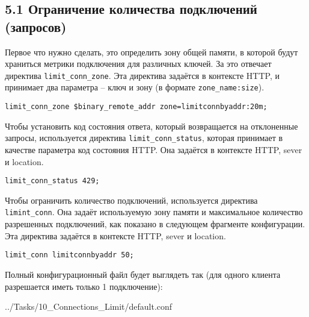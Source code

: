 \subsection*{5.1 Ограничение количества подключений (запросов)}

Первое что нужно сделать, это определить зону общей памяти, в которой будут храниться метрики подключения для различных ключей. За это отвечает директива \texttt{limit\_conn\_zone}. Эта директива задаётся в контексте HTTP, и принимает два параметра -- ключ и зону (в формате \texttt{zone\_name:size}).

\texttt{limit\_conn\_zone \$binary\_remote\_addr zone=limitconnbyaddr:20m;}

Чтобы установить код состояния ответа, который возвращается на отклоненные запросы, используется директива \texttt{limit\_conn\_status}, которая принимает в качестве параметра код состояния HTTP. Она задаётся в контексте HTTP, sever и location.

\texttt{limit\_conn\_status 429;}

Чтобы ограничить количество подключений, используется директива \texttt{limint\_conn}. Она задаёт используемую зону памяти и максимальное количество разрешенных подключений, как показано в следующем фрагменте конфигурации. Эта директива задаётся в контексте HTTP, sever и location.

\texttt{limit\_conn   limitconnbyaddr  50;}

Полный конфигурационный файл будет выглядеть так (для одного клиента разрешается иметь только 1 подключение):

{../Tasks/10_Connections_Limit/default.conf}

